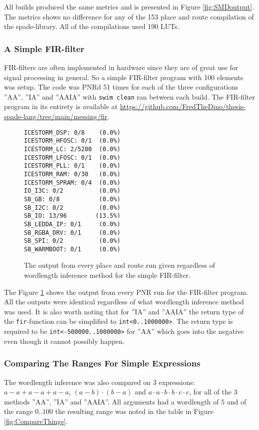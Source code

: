 All builds produced the same metrics and is presented in Figure \ref{fig:SMDoutput}. The metrics shows no difference for any of the 153 place and route compilation of the spade-library. All of the compilations used 190 LUTs. 

\subsubsection{A Simple FIR-filter}
FIR-filters are often implemented in hardware since they are of great use for signal processing in general. So a simple FIR-filter program with 100 elements was setup. The code was PNRd 51 times for each of the three configurations ''AA'', ''IA'' and ''AAIA'' with \verb+swim clean+ ran between each build. The FIR-filter program in its entirety is available at \href{https://github.com/FredTheDino/thesis-spade-lang/tree/main/messing/fir}{https://github.com/FredTheDino/thesis-spade-lang/tree/main/messing/fir}.

\begin{figure}
\begin{center}
\begin{verbatim}
ICESTORM_DSP: 0/8    (0.0%)
ICESTORM_HFOSC: 0/1  (0.0%)
ICESTORM_LC: 2/5280  (0.0%)
ICESTORM_LFOSC: 0/1  (0.0%)
ICESTORM_PLL: 0/1    (0.0%)
ICESTORM_RAM: 0/30   (0.0%)
ICESTORM_SPRAM: 0/4  (0.0%)
IO_I3C: 0/2          (0.0%)
SB_GB: 0/8           (0.0%)
SB_I2C: 0/2          (0.0%)
SB_IO: 13/96        (13.5%)
SB_LEDDA_IP: 0/1     (0.0%)
SB_RGBA_DRV: 0/1     (0.0%)
SB_SPI: 0/2          (0.0%)
SB_WARMBOOT: 0/1     (0.0%)
\end{verbatim}
\end{center}

  \caption{The output from every place and route run given regardless of wordlength inference method for the simple FIR-filter.}
  \label{fig:FIRoutput}
\end{figure}

The Figure \ref{fig:FIRoutput} shows the output from every PNR run for the FIR-filter program. All the outputs were identical regardless of what wordlength inference method was used. It is also worth noting that for ''IA'' and ''AAIA'' the return type of the \verb+fir+-function can be simplified to \verb+int<0..1000000>+. The return type is required to be \verb+int<-500000..1000000>+ for ''AA'' which goes into the negative even though it cannot possibly happen.

\subsubsection{Comparing The Ranges For Simple Expressions}
The wordlength inference was also compared on 3 expressions: $a - a + a - a + a - a$, $(a - b) \cdot (b - a)$ and $a \cdot a \cdot b \cdot b \cdot c \cdot c$, for all of the 3 methods ''AA'', ''IA'' and ''AAIA''. All arguments had a wordlength of $5$ and of the range $0..100$ the resulting range was noted in the table in Figure \ref{fig:CompareThings}.

